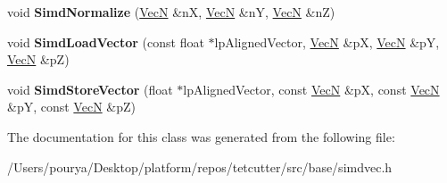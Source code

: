 \begin{DoxyCompactItemize}
\item 
\hypertarget{classps_1_1simd_1_1VecN_3_01float_00_01PS__SIMD__FLEN_01_4_abf1874ebb4042ad94cdfe48c4dee0a95}{}void {\bfseries Simd\+Normalize} (\hyperlink{classps_1_1simd_1_1VecN}{Vec\+N} \&n\+X, \hyperlink{classps_1_1simd_1_1VecN}{Vec\+N} \&n\+Y, \hyperlink{classps_1_1simd_1_1VecN}{Vec\+N} \&n\+Z)\label{classps_1_1simd_1_1VecN_3_01float_00_01PS__SIMD__FLEN_01_4_abf1874ebb4042ad94cdfe48c4dee0a95}

\item 
\hypertarget{classps_1_1simd_1_1VecN_3_01float_00_01PS__SIMD__FLEN_01_4_a14ab425f8c94d3006010844658bc20b5}{}void {\bfseries Simd\+Load\+Vector} (const float $\ast$lp\+Aligned\+Vector, \hyperlink{classps_1_1simd_1_1VecN}{Vec\+N} \&p\+X, \hyperlink{classps_1_1simd_1_1VecN}{Vec\+N} \&p\+Y, \hyperlink{classps_1_1simd_1_1VecN}{Vec\+N} \&p\+Z)\label{classps_1_1simd_1_1VecN_3_01float_00_01PS__SIMD__FLEN_01_4_a14ab425f8c94d3006010844658bc20b5}

\item 
\hypertarget{classps_1_1simd_1_1VecN_3_01float_00_01PS__SIMD__FLEN_01_4_aab502af9435ac2a50448d926cd5f8c8b}{}void {\bfseries Simd\+Store\+Vector} (float $\ast$lp\+Aligned\+Vector, const \hyperlink{classps_1_1simd_1_1VecN}{Vec\+N} \&p\+X, const \hyperlink{classps_1_1simd_1_1VecN}{Vec\+N} \&p\+Y, const \hyperlink{classps_1_1simd_1_1VecN}{Vec\+N} \&p\+Z)\label{classps_1_1simd_1_1VecN_3_01float_00_01PS__SIMD__FLEN_01_4_aab502af9435ac2a50448d926cd5f8c8b}

\end{DoxyCompactItemize}


The documentation for this class was generated from the following file\+:\begin{DoxyCompactItemize}
\item 
/\+Users/pourya/\+Desktop/platform/repos/tetcutter/src/base/simdvec.\+h\end{DoxyCompactItemize}
